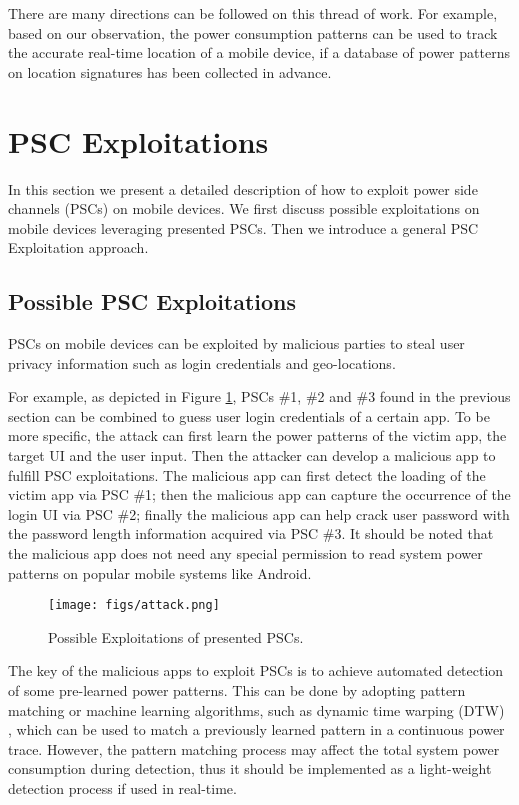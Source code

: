 \documentclass{sig-alternate}
\begin{document}
There are many directions can be followed on this thread of work. For example, based on our observation, the power consumption patterns can be used to track the accurate real-time location of a mobile device, if a database of power patterns on location signatures has been collected in advance.



\section{PSC Exploitations}
\label{sec:exploitation}

In this section we present a detailed description of how to exploit power side channels (PSCs) on mobile devices. We first discuss possible exploitations on mobile devices leveraging presented PSCs. Then we introduce a general PSC Exploitation approach. 


\subsection{Possible PSC Exploitations}
PSCs on mobile devices can be exploited by malicious parties to steal user privacy information such as login credentials and geo-locations. 

For example, as depicted in Figure \ref{fig:attack}, PSCs \#1, \#2 and \#3 found in the previous section can be combined to guess user login credentials of a certain app. To be more specific, the attack can first learn the power patterns of the victim app, the target UI and the user input. Then the attacker can develop a malicious app to fulfill PSC exploitations.  The malicious app can first detect the loading of the victim app via PSC \#1; then the malicious app can capture the occurrence of the login UI via PSC \#2; finally the malicious app can help crack user password with the password length information acquired via PSC \#3. It should be noted that the malicious app does not need any special permission to read system power patterns on popular mobile systems like Android.

\begin{figure}[!t]
\centering
\texttt{[image: figs/attack.png]}
\caption{Possible Exploitations of presented PSCs.}
\label{fig:attack}
\end{figure}

The key of the malicious apps to exploit PSCs is to achieve automated detection of some pre-learned power patterns. This can be done by adopting pattern matching or machine learning algorithms, such as dynamic time warping (DTW) \cite{muller:dynamic}, which can be used to match a previously learned pattern in a continuous power trace. However, the pattern matching process may affect the total system power consumption during detection, thus it should be implemented as a light-weight detection process if used in real-time.
\end{document}
